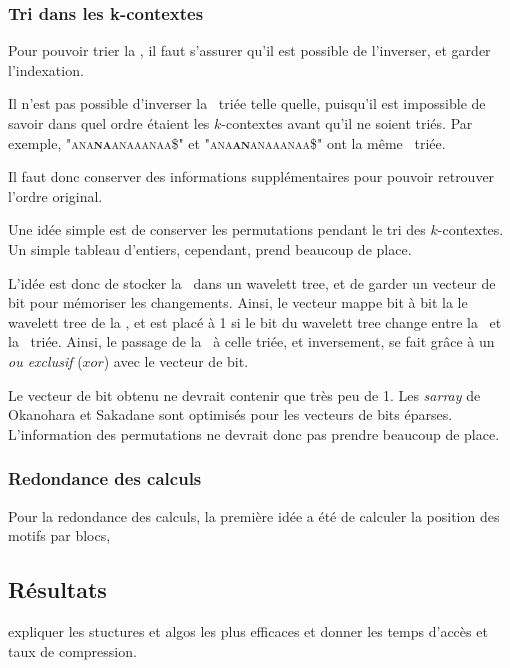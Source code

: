 \subsubsection{Tri dans les k-contextes}
Pour pouvoir trier la \kbwt, il faut s'assurer qu'il est possible de l'inverser, et garder l'indexation.

Il n'est pas possible d'inverser la \kbwt\ triée telle quelle, puisqu'il est impossible de savoir dans quel ordre étaient les $k$-contextes avant qu'il ne soient triés. Par exemple, \textsc{"ana\textbf{na}anaaanaa\$"} et \textsc{"ana\textbf{an}anaaanaa\$"} ont la même \kbwt\ triée.

Il faut donc conserver des informations supplémentaires pour pouvoir retrouver l'ordre original.

Une idée simple est de conserver les permutations pendant le tri des $k$-contextes. Un simple tableau d'entiers, cependant, prend beaucoup de place.

L'idée est donc de stocker la \kbwt\ dans un wavelett tree, et de garder un vecteur de bit pour mémoriser les changements. Ainsi, le vecteur mappe bit à bit la le wavelett tree de la \kbwt, et est placé à 1 si le bit du wavelett tree change entre la \kbwt\ et la \kbwt\ triée. Ainsi, le passage de la \kbwt\ à celle triée, et inversement, se fait grâce à un \textit{ou exclusif} ($xor$) avec le vecteur de bit.

Le vecteur de bit obtenu ne devrait contenir que très peu de 1. Les \textit{sarray} de Okanohara et Sakadane sont optimisés pour les vecteurs de bits éparses. L'information des permutations ne devrait donc pas prendre beaucoup de place.

\subsubsection{Redondance des calculs}
Pour la redondance des calculs, la première idée a été de calculer la position des motifs par blocs, %


%
%
%
%

\subsection{Résultats} 

expliquer les stuctures et algos les plus efficaces et donner les temps d'accès et taux de compression.
